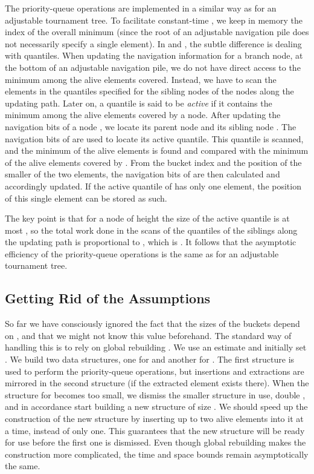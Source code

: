\documentclass[final,onetabnum,onefignum,onethmnum]{siamltex}
\newcommand{\Minimum}{\mbox{}}
\newcommand{\Insert}{\mbox{}}
\newcommand{\Extract}{\mbox{}}
\begin{document}
The priority-queue operations are implemented in a similar way as
for an adjustable tournament tree. To facilitate constant-time
\Minimum{}, we keep in memory the index of the overall minimum (since
the root of an adjustable navigation pile does not necessarily specify
a single element).  In \Insert{} and \Extract{}, the subtle difference
is dealing with quantiles. When updating the
navigation information for a branch node, at the bottom of an
adjustable navigation pile, we do not have direct access to the
minimum among the alive elements covered. Instead, we have to scan the
elements in the quantiles specified for the sibling nodes of the nodes
along the updating path.  Later on, a quantile is said to be
\emph{active} if it contains the minimum among the alive elements
covered by a node.  After updating the navigation bits of a node ,
we locate its parent node  and its sibling node . The navigation bits of
 are used to locate its active quantile.  This quantile is
scanned, and the minimum of the alive elements is found and compared
with the minimum of the alive elements covered by . From the bucket
index and the position of the smaller of the two elements, the
navigation bits of  are then calculated and accordingly
updated. If the active quantile of  has only one element, the
position of this single element can be stored as such.

The key point is that for a node of height  the size of the active
quantile is at most , so the total work
done in the scans of the quantiles of the siblings along the updating
path is proportional to , which is .  It follows that the
asymptotic efficiency of the priority-queue operations is the same as for an
adjustable tournament tree.

\subsection{Getting Rid of the Assumptions}  So far we have consciously
ignored the fact that the sizes of the buckets depend on , 
and that we might not know this value beforehand. The
standard way of handling this is to rely on global
rebuilding \cite[Chapter V]{Ove83}. We use an estimate  and initially set .
We build two data structures, one for  and another for . The first structure
is used to perform the priority-queue operations, but insertions and
extractions  are mirrored in the second structure (if the extracted element exists there).  
When the structure for  becomes too small, we dismiss the smaller structure
in use, double , and in accordance start building a new structure of size . 
We should speed up the construction of the new structure by inserting up to two
alive elements into it at a time, instead of only one. This guarantees
that the new structure will be ready for use before the first one
is dismissed.  Even though global rebuilding makes the
construction more complicated, the time and space
bounds remain asymptotically the same.
\end{document}

